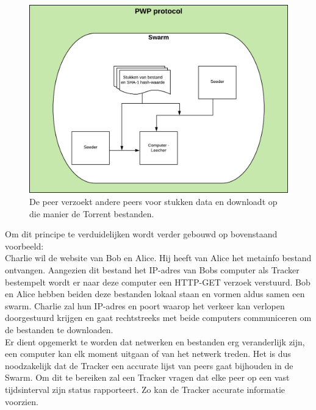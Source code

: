 \begin{figure}[h!]
	\centering
		\includegraphics[scale=0.6]{torrent-3.png}
	\caption[PWP stap - Torrenting 3]{De peer verzoekt andere peers voor stukken data en downloadt op die manier de Torrent bestanden.}
\end{figure}
\newpage
Om dit principe te verduidelijken wordt verder gebouwd op bovenstaand voorbeeld:\\

Charlie wil de website van Bob en Alice. Hij heeft van Alice het metainfo bestand ontvangen. Aangezien dit bestand het IP-adres van Bobs computer als Tracker bestempelt wordt er naar deze computer een HTTP-GET verzoek verstuurd. Bob en Alice hebben beiden deze bestanden lokaal staan en vormen aldus samen een swarm. Charlie zal hun IP-adres en poort waarop het verkeer kan verlopen doorgestuurd krijgen en gaat rechtstreeks met beide computers communiceren om de bestanden te downloaden.\\

Er dient opgemerkt te worden dat netwerken en bestanden erg veranderlijk zijn, een computer kan elk moment uitgaan of van het netwerk treden. Het is dus noodzakelijk dat de Tracker een accurate lijst van peers gaat bijhouden in de Swarm. Om dit te bereiken zal een Tracker vragen dat elke peer op een vast tijdsinterval zijn status rapporteert. Zo kan de Tracker accurate informatie voorzien.\\


